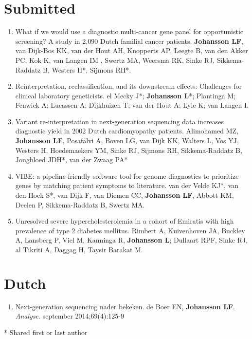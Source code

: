\begin{appendices}
	\section*{Submitted}
	\begin{enumerate}
		\item What if we would use a diagnostic multi-cancer gene panel for opportunistic screening? A study in 2,090 Dutch familial cancer patients.  \textbf{Johansson LF}, van Dijk-Bos KK, van der Hout AH, Knopperts AP, Leegte B, van den Akker PC, Kok K, van Langen IM , Swertz MA, Weersma RK, Sinke RJ, Sikkema-Raddatz B, Westers H*,  Sijmons RH*.
		\item Reinterpretation, reclassification, and its downstream effects: Challenges for clinical laboratory geneticists. el Mecky J*; \textbf{Johansson L}*; Plantinga M; Fenwick A; Lucassen A; Dijkhuizen T; van der Hout A; Lyle K; van Langen I.
		\item Variant re-interpretation in next-generation sequencing data increases diagnostic yield in 2002 Dutch cardiomyopathy patients. Alimohamed MZ, \textbf{Johansson LF}, Posafalvi A, Boven LG, van Dijk KK, Walters L, Vos YJ, Westers H, Hoedemaekers YM, Sinke RJ, Sijmons RH, Sikkema-Raddatz B, Jongbloed JDH*, van der Zwaag PA*
		\item VIBE: a pipeline-friendly software tool for genome diagnostics to prioritize genes by matching patient symptoms to literature. van der Velde KJ*, van den Hoek S*, van Dijk F, van Diemen CC, \textbf{Johansson LF}, Abbott KM, Deelen P, Sikkema-Raddatz B, Swertz MA. 
		\item Unresolved severe hypercholesterolemia in a cohort of Emiratis with high prevalence of type 2 diabetes mellitus. Rimbert A, Kuivenhoven JA, Buckley A, Lansberg P, Viel M, Kanninga R, \textbf{Johansson L}; Dullaart RPF, Sinke RJ, al Tikriti A, Daggag H, Taysir Barakat M.
	\end{enumerate}
	
	\section*{Dutch}
	\begin{enumerate}
		\item Next-generation sequencing nader bekeken. de Boer EN, \textbf{Johansson LF}. \textsl{Analyse}. september 2014;69(4):125-9 \\
	\end{enumerate}
	
	* Shared first or last author
	

\end{appendices}
